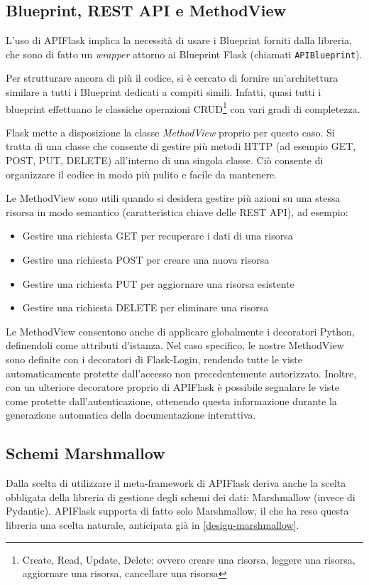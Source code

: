 \subsection{Blueprint, REST API e MethodView}
L'uso di APIFlask implica la necessità di usare i Blueprint forniti dalla libreria, che sono di fatto un \emph{wrapper} attorno ai Blueprint Flask (chiamati \texttt{APIBlueprint}).

Per strutturare ancora di più il codice, si è cercato di fornire un'architettura similare a tutti i Blueprint dedicati a compiti simili. Infatti, quasi tutti i blueprint effettuano le classiche operazioni CRUD\footnote{Create, Read, Update, Delete: ovvero creare una risorsa, leggere una risorsa, aggiornare una risorsa, cancellare una risorsa} con vari gradi di completezza.

Flask mette a disposizione la classe \emph{MethodView} proprio per questo caso. Si tratta di una classe che consente di gestire più metodi HTTP (ad esempio GET, POST, PUT, DELETE) all'interno di una singola classe. Ciò consente di organizzare il codice in modo più pulito e facile da mantenere.

Le MethodView sono utili quando si desidera gestire più azioni su una stessa risorsa in modo semantico (caratteristica chiave delle REST API), ad esempio:
\begin{itemize}
    \item Gestire una richiesta GET per recuperare i dati di una risorsa
    \item Gestire una richiesta POST per creare una nuova risorsa
    \item Gestire una richiesta PUT per aggiornare una risorsa esistente
    \item Gestire una richiesta DELETE per eliminare una risorsa
\end{itemize}

Le MethodView consentono anche di applicare globalmente i decoratori Python, definendoli come attributi d'istanza. Nel caso specifico, le nostre MethodView sono definite con i decoratori di Flask-Login, rendendo tutte le viste automaticamente protette dall'accesso non precedentemente autorizzato. Inoltre, con un ulteriore decoratore proprio di APIFlask è possibile segnalare le viste come protette dall'autenticazione, ottenendo questa informazione durante la generazione automatica della documentazione interattiva.

\subsection{Schemi Marshmallow}
Dalla scelta di utilizzare il meta-framework di APIFlask deriva anche la scelta obbligata della libreria di gestione degli schemi dei dati: Marshmallow (invece di Pydantic). APIFlask supporta di fatto solo Marshmallow, il che ha reso questa libreria una scelta naturale, anticipata già in \ref{design-marshmallow}.

